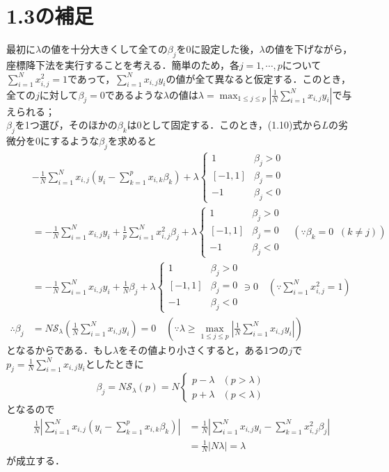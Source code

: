 \documentclass{jsarticle}
\theoremstyle{definition}
\theoremstyle{mystyle} %
\begin{document}
\large
\section*{1.3の補足}
最初に$\lambda$の値を十分大きくして全ての$\beta_j$を$0$に設定した後，$\lambda$の値を下げながら，座標降下法を実行することを考える．簡単のため，各$j=1,\cdots,p$について$\displaystyle\sum_{i=1}^Nx_{i,j}^2=1$であって，$\displaystyle\sum_{i=1}^Nx_{i,j}y_i$の値が全て異なると仮定する．このとき，全ての$j$に対して$\beta_j=0$であるような$\lambda$の値は$\lambda = \displaystyle\max_{1\leq j\leq p}\left|\frac{1}{N}\sum_{i=1}^Nx_{i,j}y_i\right|$で与えられる；\\
$\beta_j$を1つ選び，そのほかの$\beta_k$は$0$として固定する．このとき，(1.10)式から$L$の劣微分を$0$にするような$\beta_j$を求めると
\begin{align*}
&-\frac{1}{N}\sum_{i=1}^Nx_{i,j}\left(y_i-\sum_{k=1}^px_{i,k}\beta_k\right)+\lambda\begin{cases}
1 & \beta_j>0\\
[-1,1] & \beta_j = 0\\
-1 & \beta_j<0
\end{cases}\\
&=-\frac{1}{N}\sum_{i=1}^Nx_{i,j}y_i+\frac{1}{p}\sum_{i=1}^Nx_{i,j}^2\beta_j+\lambda\begin{cases}
1 & \beta_j>0\\
[-1,1] & \beta_j = 0\\
-1 & \beta_j<0
\end{cases}\quad(\because \beta_k = 0\;\;(k\neq j))\\
&=-\frac{1}{N}\sum_{i=1}^Nx_{i,j}y_i+\frac{1}{N}\beta_j +\lambda\begin{cases}
1 & \beta_j>0\\
[-1,1] & \beta_j = 0\\
-1 & \beta_j<0
\end{cases}\ni 0\quad\left(\because \sum_{i=1}^Nx_{i,j}^2=1\right)\\
\therefore \beta_j &= N\mathcal{S}_{\lambda}\left(\frac{1}{N}\sum_{i=1}^Nx_{i,j}y_i\right) = 0\quad\left(\because \lambda\geq \max_{1\leq j\leq p}\left|\frac{1}{N}\sum_{i=1}^Nx_{i,j}y_i\right|\right)
\end{align*}
となるからである．もし$\lambda$をその値より小さくすると，ある1つの$j$で$p_j = \displaystyle\frac{1}{N}\sum_{i=1}^Nx_{i,j}y_i$としたときに
$$\beta_j =  N\mathcal{S}_{\lambda}\left(p\right)= N\begin{cases}
p-\lambda & (p>\lambda)\\
p + \lambda & (p<\lambda)
\end{cases}$$
となるので
\begin{align*}
\frac{1}{N}\left|\sum_{i=1}^Nx_{i,j}\left(y_i-\sum_{k=1}^px_{i,k}\beta_k\right)\right| &= \frac{1}{N}\left|\sum_{i=1}^N x_{i,j}y_i - \sum_{k=1}^Nx_{i,j}^2 \beta_j\right|\\
&=\frac{1}{N}|N\lambda|=\lambda
\end{align*}
が成立する．\\
\end{document}
